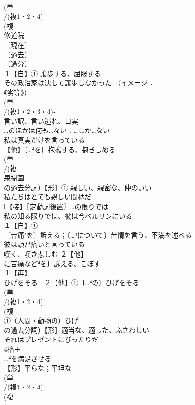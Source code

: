 \documentclass[8pt]{extreport}
\begin{document}
\begin{CJK}{UTF8}{min}
\\	(単
\\	/(複1・2・4)
\\	(複
\\	修道院 
\\	〔現在〕
\\	〔過去〕
\\	〔過分〕
\\	１【自】① 譲歩する、屈服する 
\\	その政治家は決して譲歩しなかった （イメージ：
\\	《劣等》）
\\	(単
\\	/(複1・2・3・4)‐
\\	言い訳、言い逃れ、口実 
\\	…のほかは何も…ない；…しか…ない　
\\	私は真実だけを言っている
\\	【他】〔…⁴を〕抱擁する、抱きしめる 
\\	(単
\\	/(複
\\	果樹園 
\\	の過去分詞）【形】① 親しい、親密な、仲のいい 
\\	私たちはとても親しい間柄だ
\\	Ⅰ【接】〖定動詞後置〗…の限りでは 
\\	私の知る限りでは、彼は今ベルリンにいる
\\	１【自】①
\\	〔苦痛⁴を〕訴える；〔…⁴について〕苦情を言う、不満を述べる 
\\	彼は頭が痛いと言っている 
\\	嘆く、嘆き悲しむ ２【他】
\\	に苦痛など⁴を〕訴える、こぼす
\\	１【再】
\\	ひげをそる　２【他】①〔…⁴の〕ひげをそる 
\\	(単
\\	/(複1・2・4)
\\	(複
\\	①（人間・動物の）ひげ 
\\	の過去分詞）【形】適当な、適した、ふさわしい 
\\	それはプレゼントにぴったりだ 
\\	4格＋
\\	…⁴を満足させる
\\	【形】平らな；平坦な 
\\	(単
\\	/(複1・2・4)-
\\	(複

\end{CJK}
\end{document}
